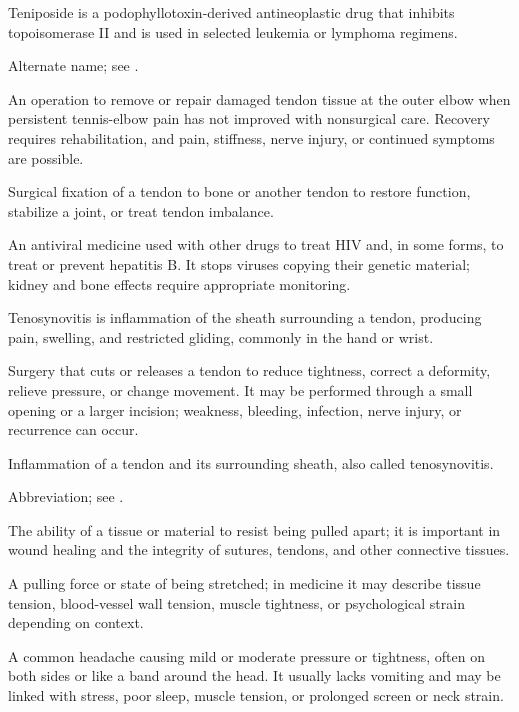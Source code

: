  Teniposide is a podophyllotoxin-derived antineoplastic drug that inhibits topoisomerase II and is used in selected leukemia or lymphoma regimens.

 Alternate name; see .

 An operation to remove or repair damaged tendon tissue at the outer elbow when persistent tennis-elbow pain has not improved with nonsurgical care. Recovery requires rehabilitation, and pain, stiffness, nerve injury, or continued symptoms are possible.

 Surgical fixation of a tendon to bone or another tendon to restore function, stabilize a joint, or treat tendon imbalance.

 An antiviral medicine used with other drugs to treat HIV and, in some forms, to treat or prevent hepatitis B. It stops viruses copying their genetic material; kidney and bone effects require appropriate monitoring.

 Tenosynovitis is inflammation of the sheath surrounding a tendon, producing pain, swelling, and restricted gliding, commonly in the hand or wrist.

 Surgery that cuts or releases a tendon to reduce tightness, correct a deformity, relieve pressure, or change movement. It may be performed through a small opening or a larger incision; weakness, bleeding, infection, nerve injury, or recurrence can occur.

 Inflammation of a tendon and its surrounding sheath, also called tenosynovitis.

 Abbreviation; see .

 The ability of a tissue or material to resist being pulled apart; it is important in wound healing and the integrity of sutures, tendons, and other connective tissues.

 A pulling force or state of being stretched; in medicine it may describe tissue tension, blood-vessel wall tension, muscle tightness, or psychological strain depending on context.

 A common headache causing mild or moderate pressure or tightness, often on both sides or like a band around the head. It usually lacks vomiting and may be linked with stress, poor sleep, muscle tension, or prolonged screen or neck strain.

